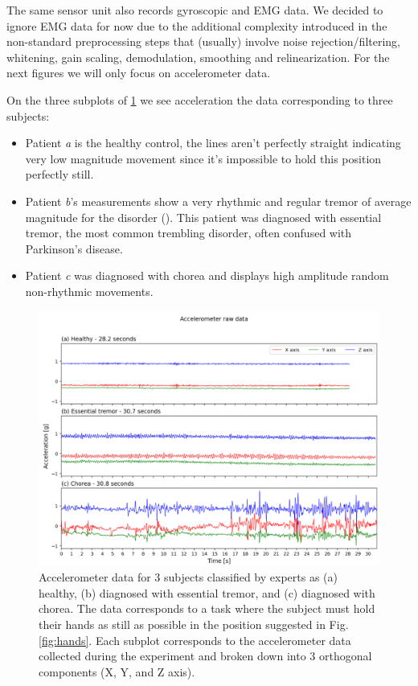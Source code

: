 The same sensor unit also records gyroscopic and EMG data. We decided to ignore EMG data for now due to the additional complexity introduced in the non-standard preprocessing steps that (usually) involve noise rejection/filtering, whitening, gain scaling, demodulation, smoothing and relinearization. For the next figures we will only focus on accelerometer data.


On the three subplots of \cref{fig:acc} we see acceleration the data corresponding to three subjects: 
\begin{itemize}
    \item Patient \textit{a} is the healthy control, the lines aren't perfectly straight indicating very low magnitude movement since it's impossible to hold this position perfectly still.
    \item Patient \textit{b}'s measurements show a very rhythmic and regular tremor of average magnitude for the disorder (). This patient was diagnosed with essential tremor, the most common trembling disorder, often confused with Parkinson's disease.
    \item Patient \textit{c} was diagnosed with chorea and displays high amplitude random non-rhythmic movements. 
\end{itemize}
 

\begin{figure}[ht]
\centering
\includegraphics[width=\linewidth]{figures/nemo/acc2.png}
\caption{Accelerometer data for 3 subjects classified by experts as (a) healthy, (b) diagnosed with essential tremor, and (c) diagnosed with chorea. The data corresponds to a task where the subject must hold their hands as still as possible in the position suggested in Fig. \ref{fig:hands}.
Each subplot corresponds to the accelerometer data collected during the experiment and broken down into 3 orthogonal components (X, Y, and Z axis). }
\label{fig:acc}
\end{figure}


